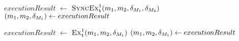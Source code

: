 \begin{algorithmic}[1]
        \algindentskip
            \State \Return{$\bot$}
        \EndIf
        \algblockskip

         \label{algo:synchronization:execute_synchronizing_bidirectional_transformation:line:synchronizationstart}
            \State $executionResult$ $\leftarrow$ $\textsc{SyncEx}_{\mathfrak{t}}^1(m_{1}, m_{2}, \delta_{M_{1}}, \delta_{M_{2}})$
                \State \Return{$\bot$} \label{algo:synchronization:execute_synchronizing_bidirectional_transformation:line:returnbot1}
            \Else
                \State $(m_{1}, m_{2}, \delta_{M_{1}}) \gets executionResult$
            \EndIf
        \EndIf \label{algo:synchronization:execute_synchronizing_bidirectional_transformation:line:synchronizationend}
        \algblockskip

            \State $executionResult$ $\leftarrow$ $\textsc{Ex}_{\mathfrak{t}}^1(m_{1}, m_{2}, \delta_{M_{1}})$
                \State \Return{$\bot$} \label{algo:execute_synchronizing_bidirectional_transformation:line:returnbot2}
            \Else
                \State $(m_{1}, m_{2}, \delta_{M_{1}}) \gets executionResult$
            \EndIf
        \EndWhile
        \algblockskip

        \State {} \label{algo:synchronization:execute_synchronizing_bidirectional_transformation:line:returnresult}
        \algindentskip
    \EndProcedure
\end{algorithmic}